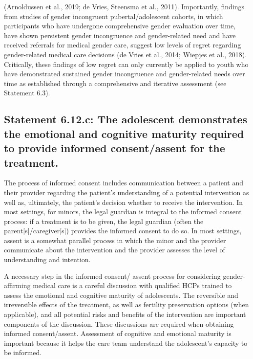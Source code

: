\documentclass[
]{book}
\begin{document}
(Arnoldussen et al., 2019; de Vries, Steensma
et al., 2011). Importantly, findings from studies
of gender incongruent pubertal/adolescent
cohorts, in which participants who have undergone comprehensive gender evaluation over
time, have shown persistent gender incongruence
and gender-related need and have received referrals for medical gender care, suggest low levels
of regret regarding gender-related medical care
decisions (de Vries et al., 2014; Wiepjes et al.,
2018). Critically, these findings of low regret
can only currently be applied to youth who have
demonstrated sustained gender incongruence
and gender-related needs over time as established through a comprehensive and iterative
assessment (see Statement 6.3).

\hypertarget{statement-6.12.c-the-adolescent-demonstrates-the-emotional-and-cognitive-maturity-required-to-provide-informed-consentassent-for-the-treatment.}{%
\subsection*{Statement 6.12.c: The adolescent demonstrates the emotional and cognitive maturity required to provide informed consent/assent for the treatment.}\label{statement-6.12.c-the-adolescent-demonstrates-the-emotional-and-cognitive-maturity-required-to-provide-informed-consentassent-for-the-treatment.}}

The process of informed consent includes communication between a patient and their provider
regarding the patient's understanding of a potential intervention as well as, ultimately, the patient's
decision whether to receive the intervention. In
most settings, for minors, the legal guardian is
integral to the informed consent process: if a
treatment is to be given, the legal guardian (often
the parent{[}s{]}/caregiver{[}s{]}) provides the informed
consent to do so. In most settings, assent is a
somewhat parallel process in which the minor
and the provider communicate about the intervention and the provider assesses the level of
understanding and intention.

A necessary step in the informed consent/
assent process for considering gender-affirming
medical care is a careful discussion with qualified
HCPs trained to assess the emotional and cognitive maturity of adolescents. The reversible and
irreversible effects of the treatment, as well as
fertility preservation options (when applicable),
and all potential risks and benefits of the intervention are important components of the discussion. These discussions are required when
obtaining informed consent/assent. Assessment
of cognitive and emotional maturity is important
because it helps the care team understand the
adolescent's capacity to be informed.
\end{document}
